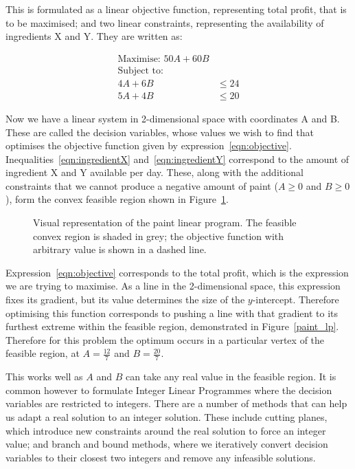 This is formulated as a linear objective function, representing total profit,
that is to be maximised; and two linear constraints, representing the
availability of ingredients X and Y. They are written as:

\begin{align}
\text{Maximise: } 50 A + 60 B & \\\label{eqn:objective}
\text{Subject to: } & \nonumber \\
4 A + 6 B &\leq 24 \\\label{eqn:ingredientX}
5 A + 4 B &\leq 20 \label{eqn:ingredientY}
\end{align}

Now we have a linear system in 2-dimensional space with coordinates A and B.
These are called the decision variables, whose values we wish to find that
optimises the objective function given by expression~\ref{eqn:objective}.
Inequalities~\ref{eqn:ingredientX} and~\ref{eqn:ingredientY} correspond to the
amount of ingredient X and Y available per day. These, along with the additional
constraints that we cannot produce a negative amount of paint
($A \geq 0$ and $B \geq 0$), form the convex feasible region shown in
Figure~\ref{fig:paint_lp}.

\begin{figure}
\begin{center}

\end{center}
\caption{Visual representation of the paint linear program. The feasible convex
region is shaded in grey; the objective function with arbitrary value is shown
in a dashed line.}
\label{fig:paint_lp}
\end{figure}

Expression~\ref{eqn:objective} corresponds to the total profit, which is the
expression we are trying to maximise. As a line in the 2-dimensional space, this
expression fixes its gradient, but its value determines the size of the
$y$-intercept. Therefore optimising this function corresponds to pushing a line
with that gradient to its furthest extreme within the feasible region,
demonstrated in Figure~\ref{paint_lp}.
Therefore for this problem the optimum occurs in a particular vertex of the
feasible region, at $A = \frac{12}{7}$ and $B = \frac{20}{7}$.

This works well as $A$ and $B$ can take any real value in the feasible region.
It is common however to formulate Integer Linear Programmes where the decision
variables are restricted to integers. There are a number of methods that can
help us adapt a real solution to an integer solution. These include cutting
planes, which introduce new constraints around the real solution to force an
integer value; and branch and bound methods, where we iteratively convert
decision variables to their closest two integers and remove any infeasible
solutions.

